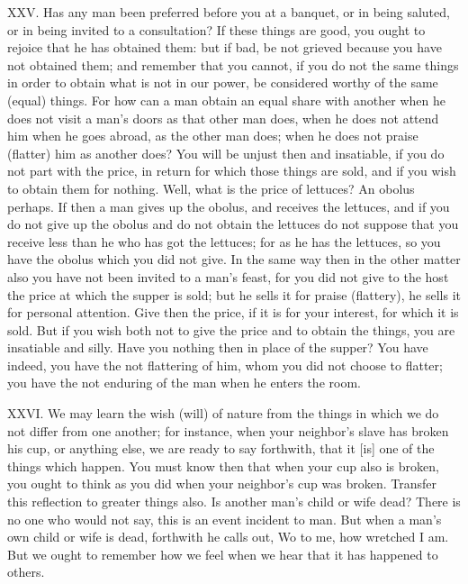 XXV. Has any man been preferred before you at a banquet, or in being saluted, or in being invited to a consultation? If these things are good, you ought to rejoice that he has obtained them: but if bad, be not grieved because you have not obtained them; and remember that you cannot, if you do not the same things in order to obtain what is not in our power, be considered worthy of the same (equal) things. For how can a man obtain an equal share with another when he does not visit a man's doors as that other man does, when he does not attend him when he goes abroad, as the other man does; when he does not praise (flatter) him as another does? You will be unjust then and insatiable, if you do not part with the price, in return for which those things are sold, and if you wish to obtain them for nothing. Well, what is the price of lettuces? An obolus perhaps. If then a man gives up the obolus, and receives the lettuces, and if you do not give up the obolus and do not obtain the lettuces do not suppose that you receive less than he who has got the lettuces; for as he has the lettuces, so you have the obolus which you did not give. In the same way then in the other matter also you have not been invited to a man's feast, for you did not give to the host the price at which the supper is sold; but he sells it for praise (flattery), he sells it for personal attention. Give then the price, if it is for your interest, for which it is sold. But if you wish both not to give the price and to obtain the things, you are insatiable and silly. Have you nothing then in place of the supper? You have indeed, you have the not flattering of him, whom you did not choose to flatter; you have the not enduring of the man when he enters the room.



XXVI. We may learn the wish (will) of nature from the things in which we do not differ from one another; for instance, when your neighbor's slave has broken his cup, or anything else, we are ready to say forthwith, that it [is] one of the things which happen. You must know then that when your cup also is broken, you ought to think as you did when your neighbor's cup was broken. Transfer this reflection to greater things also. Is another man's child or wife dead? There is no one who would not say, this is an event incident to man. But when a man's own child or wife is dead, forthwith he calls out, Wo to me, how wretched I am. But we ought to remember how we feel when we hear that it has happened to others.



